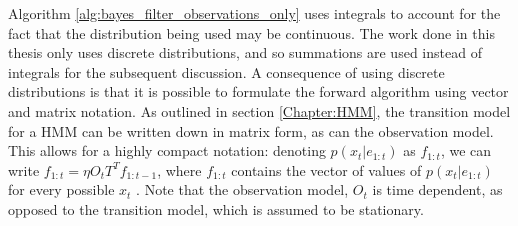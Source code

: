 Algorithm \ref{alg:bayes_filter_observations_only} uses integrals to account for the fact that the distribution being used may be continuous. The work done in this thesis only uses discrete distributions, and so summations are used instead of integrals for the subsequent discussion. A consequence of using discrete distributions is that it is possible to formulate the forward algorithm using vector and matrix notation. As outlined in section \ref{Chapter:HMM}, the transition model for a HMM can be written down in matrix form, as can the observation model. This allows for a highly compact notation: denoting $p(x_t | e_{1:t})$ as $f_{1:t}$, we can write $f_{1:t} = \eta O_{t} T^{T} f_{1:t-1}$, where $f_{1:t}$ contains the vector of values of $p(x_t | e_{1:t})$ for every possible $x_t$ \cite[p.~579]{AIAMA}. Note that the observation model, $O_t$ is time dependent, as opposed to the transition model, which is assumed to be stationary.\par

